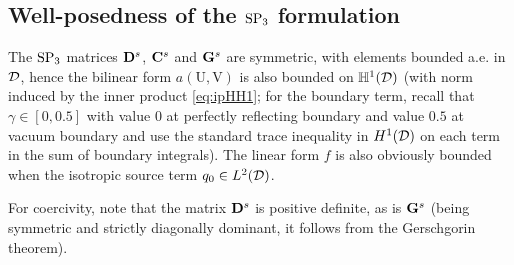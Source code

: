 \subsection{Well-posedness of the $\SPN[3]$ formulation}


The $\SPN[3]$ matrices $\mat{D}^s$, $\mat{C}^s$ and $\mat{G}^s$ are symmetric, with elements bounded
a.e. in $\VV$, hence the bilinear form $a(\mathrm{U}, \mathrm{V})$ is also bounded on $\mathbb{H}^1(\VV)$ (with norm
induced by the inner product \eqref{eq:ipHH1}; for the boundary term,  recall that $\gamma \in [0,0.5]$ with value $0$ at perfectly 
reflecting boundary and value $0.5$ at vacuum boundary and use the standard trace inequality in
$H^1(\VV)$ on each term in the sum of boundary integrals). The linear form $f$ is also obviously bounded when the
isotropic source term $q_0 \in \Lp[2](\VV)$.

For coercivity, note that the matrix $\mat{D}^s$ is positive definite, as is $\mat{G}^s$ (being symmetric and strictly
diagonally dominant, it follows from the Gerschgorin theorem). 

